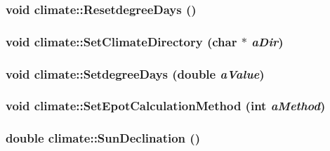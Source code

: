 \label{classclimate_a2a5a0fd4f393d95c69ecf170d06513fb}
\hypertarget{classclimate_acd7a190f36febe69da0a91de788c304e}{
\subsubsection[{ResetdegreeDays}]{\setlength{\rightskip}{0pt plus 5cm}void climate::ResetdegreeDays ()}}
\label{classclimate_acd7a190f36febe69da0a91de788c304e}
\hypertarget{classclimate_a60376d9b9f2a73043315165121d970d4}{
\subsubsection[{SetClimateDirectory}]{\setlength{\rightskip}{0pt plus 5cm}void climate::SetClimateDirectory (char $\ast$ {\em aDir})}}
\label{classclimate_a60376d9b9f2a73043315165121d970d4}
\hypertarget{classclimate_ae42dad7e08de795d5acdd7a9ebea4996}{
\subsubsection[{SetdegreeDays}]{\setlength{\rightskip}{0pt plus 5cm}void climate::SetdegreeDays (double {\em aValue})}}
\label{classclimate_ae42dad7e08de795d5acdd7a9ebea4996}
\hypertarget{classclimate_a9395948a8e53f92bf3a56074f337c3e2}{
\subsubsection[{SetEpotCalculationMethod}]{\setlength{\rightskip}{0pt plus 5cm}void climate::SetEpotCalculationMethod (int {\em aMethod})}}
\label{classclimate_a9395948a8e53f92bf3a56074f337c3e2}
\hypertarget{classclimate_a063a1aa7e8e9cdc58c781e67d012c2d3}{
\subsubsection[{SunDeclination}]{\setlength{\rightskip}{0pt plus 5cm}double climate::SunDeclination ()}}
